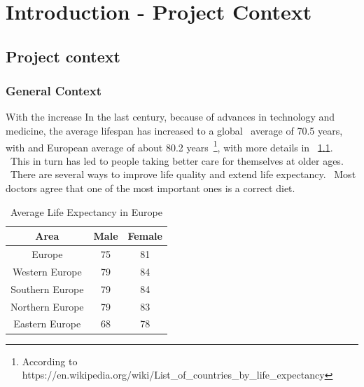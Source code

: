 \usepackage{graphicx}


\chapter{Introduction - Project Context}
\label{ch:introduction}
\pagestyle{headings}

\section{Project context}
\label{sec:introduction-context}

\subsection{General Context}
\label{subsec:introduciton-general-context}
With the increase
In the last century, because of advances in technology and medicine, the average lifespan has increased to a global \
average of 70.5 years, with and European average of about 80.2 years\
\footnote{According to https://en.wikipedia.org/wiki/List\_of\_countries\_by\_life\_expectancy}, with more details in \
\ref{table:lifeExpectancy}. \
This in turn has led to people taking better care for themselves at older ages. \
There are several ways to improve life quality and extend life expectancy. \
Most doctors agree that one of the most important ones is a correct diet.

\begin{table}[ht]
    \caption{Average Life Expectancy in Europe}
    \centering                          %
    \begin{tabular}{|c|c|c|}          %
        \hline\hline                        %
        Area & Male & Female \\ [0.5ex]   %
        \hline                              %
        Europe & 75 & 81 \\               %
        Western Europe & 79 & 84  \\
        Southern Europe & 79 & 84 \\           %
        Northern Europe & 79 & 83  \\
        Eastern Europe & 68 & 78 \\[1ex]
        \hline
    \end{tabular}
    \label{table:lifeExpectancy}
\end{table}

